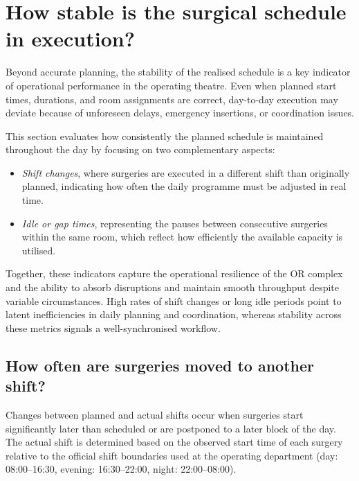 \documentclass[
]{article}
\providecommand{\tightlist}{%
  \setlength{\itemsep}{0pt}\setlength{\parskip}{0pt}}
\begin{document}
\newpage

\section{How stable is the surgical schedule in
execution?}\label{how-stable-is-the-surgical-schedule-in-execution}

Beyond accurate planning, the stability of the realised schedule is a
key indicator of operational performance in the operating theatre. Even
when planned start times, durations, and room assignments are correct,
day-to-day execution may deviate because of unforeseen delays, emergency
insertions, or coordination issues.

This section evaluates how consistently the planned schedule is
maintained throughout the day by focusing on two complementary aspects:

\begin{itemize}
\tightlist
\item
  \emph{Shift changes}, where surgeries are executed in a different
  shift than originally planned, indicating how often the daily
  programme must be adjusted in real time.
\item
  \emph{Idle or gap times}, representing the pauses between consecutive
  surgeries within the same room, which reflect how efficiently the
  available capacity is utilised.
\end{itemize}

Together, these indicators capture the operational resilience of the OR
complex and the ability to absorb disruptions and maintain smooth
throughput despite variable circumstances. High rates of shift changes
or long idle periods point to latent inefficiencies in daily planning
and coordination, whereas stability across these metrics signals a
well-synchronised workflow.

\subsection{How often are surgeries moved to another
shift?}\label{how-often-are-surgeries-moved-to-another-shift}

Changes between planned and actual shifts occur when surgeries start
significantly later than scheduled or are postponed to a later block of
the day. The actual shift is determined based on the observed start time
of each surgery relative to the official shift boundaries used at the
operating department (day: 08:00--16:30, evening: 16:30--22:00, night:
22:00--08:00).
\end{document}
